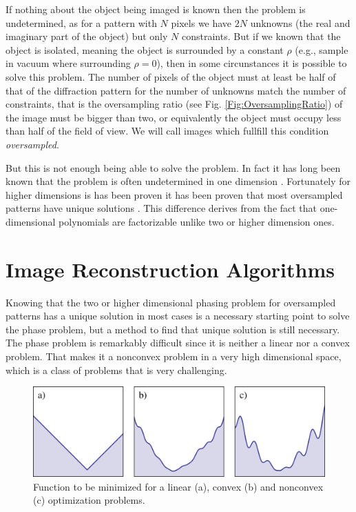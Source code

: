If nothing about the object being imaged is known then the problem is
undetermined, as for a pattern with $N$ pixels we have $2N$ unknowns (the real and
imaginary part of the object) but only $N$ constraints. But if we known that the object is isolated, meaning the
object is surrounded by a constant $\rho$ (e.g., sample in vacuum where
surrounding $\rho = 0$), then in some circunstances it is possible to solve this
problem. The number of pixels of the object must at least be half of that of the
diffraction pattern for the number of unknowns match the number of
constraints, that is the oversampling ratio (see Fig. \ref{Fig:OversamplingRatio}) of the image must be bigger than
two, or equivalently the object must occupy less than half of the field of
view. We will call images which fullfill this condition {\em oversampled}.

But this is not enough being able to solve the problem. In fact it
has long been known that the problem is often undetermined in one dimension
\cite{Walther63}. Fortunately for higher dimensions is has been proven it has
been proven that most oversampled patterns have unique solutions
\cite{Bruck79}. This difference derives from the fact that one-dimensional
polynomials are factorizable unlike two or higher dimension ones.

\section{Image Reconstruction Algorithms}

Knowing that the two or higher dimensional phasing problem for oversampled
patterns has a unique solution in most cases is a necessary starting point to
solve the phase problem, but a method to find that unique solution is still
necessary. The phase problem is remarkably difficult since it is neither a
linear nor a convex problem. That makes it a nonconvex problem in a very high
dimensional space, which is a class of problems that is very challenging.

\begin{figure}[h]
  \centering
  \includegraphics[width=1 \columnwidth]{Image_Reconstruction/convexity.png}
  \caption{Function to be minimized for a linear (a), convex (b) and nonconvex
    (c) optimization problems.}
  \label{Fig:Convexity}
\end{figure}

